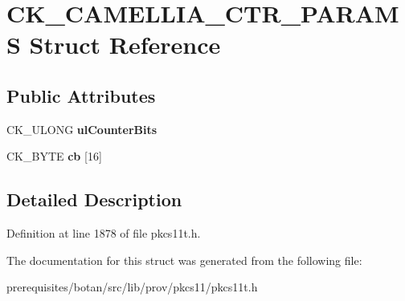 \hypertarget{struct_c_k___c_a_m_e_l_l_i_a___c_t_r___p_a_r_a_m_s}{}\section{C\+K\+\_\+\+C\+A\+M\+E\+L\+L\+I\+A\+\_\+\+C\+T\+R\+\_\+\+P\+A\+R\+A\+MS Struct Reference}
\label{struct_c_k___c_a_m_e_l_l_i_a___c_t_r___p_a_r_a_m_s}
\subsection*{Public Attributes}
\begin{DoxyCompactItemize}
\item 
\mbox{\label{struct_c_k___c_a_m_e_l_l_i_a___c_t_r___p_a_r_a_m_s_acd40627e7750b86612be7f02fdfa5515}} 
C\+K\+\_\+\+U\+L\+O\+NG {\bfseries ul\+Counter\+Bits}
\item 
\mbox{\label{struct_c_k___c_a_m_e_l_l_i_a___c_t_r___p_a_r_a_m_s_a42e929b9a6ba82f36802ce25fbb0063e}} 
C\+K\+\_\+\+B\+Y\+TE {\bfseries cb} \mbox{[}16\mbox{]}
\end{DoxyCompactItemize}


\subsection{Detailed Description}


Definition at line 1878 of file pkcs11t.\+h.



The documentation for this struct was generated from the following file\+:\begin{DoxyCompactItemize}
\item 
prerequisites/botan/src/lib/prov/pkcs11/pkcs11t.\+h\end{DoxyCompactItemize}
